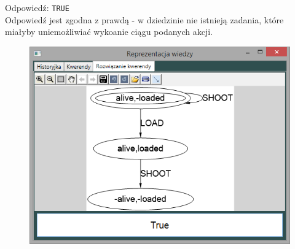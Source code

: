\documentclass{article}
\begin{document}
\begin{itemize}
    Odpowiedź: \texttt{TRUE}\\
    Odpowiedź jest zgodna z prawdą - w dziedzinie nie istnieją zadania, które miałyby uniemożliwiać wykoanie ciągu podanych akcji.
    \begin{figure}[H]
    \centering
    \includegraphics[scale=0.5]{test1_4}
    \end{figure}
\end{itemize}
\end{document}
